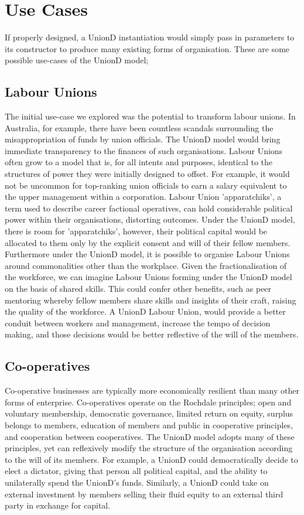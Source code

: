 \documentclass[12pt,twocolumn]{article}
\begin{document}
\section {Use Cases}

If properly designed, a UnionD instantiation would simply pass in parameters to its constructor to produce many existing forms of organisation. These are some possible use-cases of the UnionD model;

\subsection{Labour Unions}

The initial use-case we explored was the potential to transform labour unions. In Australia, for example, there have been countless scandals surrounding the misappropriation of funds by union officials. The UnionD model would bring immediate transparency to the finances of such organisations. Labour Unions often grow to a model that is, for all intents and purposes, identical to the structures of power they were initially designed to offset. For example, it would not be uncommon for top-ranking union officials to earn a salary equivalent to the upper management within a corporation. Labour Union 'apparatchiks', a term used to describe career factional operatives, can hold considerable political power within their organisations, distorting outcomes. Under the UnionD model, there is room for 'apparatchiks', however, their political capital would be allocated to them only by the explicit consent and will of their fellow members. Furthermore under the UnionD model, it is possible to organise Labour Unions around commonalities other than the workplace. Given the fractionalisation of the workforce, we can imagine Labour Unions forming under the UnionD model on the basis of shared skills. This could confer other benefits, such as peer mentoring whereby fellow members share  skills and insights of their craft, raising the quality of the workforce. A UnionD Labour Union, would provide a better conduit between workers and management, increase the tempo of decision making, and those decisions would be better reflective of the will of the members.

\subsection{Co-operatives}

Co-operative businesses are typically more economically resilient than many other forms of enterprise. Co-operatives operate on the Rochdale principles; open and voluntary membership, democratic governance, limited return on equity, surplus belongs to members, education of members and public in cooperative principles, and cooperation between cooperatives. The UnionD model adopts many of these principles, yet can reflexively modify the structure of the organisation according to the will of its members. For example, a UnionD could democratically decide to elect a dictator, giving that person all political capital, and the ability to unilaterally spend the UnionD's funds. Similarly, a UnionD could take on external investment by members selling their fluid equity to an external third party in exchange for capital.
\end{document}
